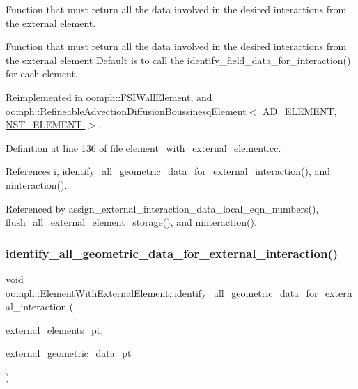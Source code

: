 Function that must return all the data involved in the desired interactions from the external element. 

Function that must return all the data involved in the desired interactions from the external element Default is to call the identify\+\_\+field\+\_\+data\+\_\+for\+\_\+interaction() for each element. 

Reimplemented in \hyperlink{classoomph_1_1FSIWallElement_a7a9552507bd4193dc3121a60453ed392}{oomph\+::\+F\+S\+I\+Wall\+Element}, and \hyperlink{classoomph_1_1RefineableAdvectionDiffusionBoussinesqElement_abb212175a68a9686ead329ba9fa330f6}{oomph\+::\+Refineable\+Advection\+Diffusion\+Boussinesq\+Element$<$ A\+D\+\_\+\+E\+L\+E\+M\+E\+N\+T, N\+S\+T\+\_\+\+E\+L\+E\+M\+E\+N\+T $>$}.



Definition at line 136 of file element\+\_\+with\+\_\+external\+\_\+element.\+cc.



References i, identify\+\_\+all\+\_\+geometric\+\_\+data\+\_\+for\+\_\+external\+\_\+interaction(), and ninteraction().



Referenced by assign\+\_\+external\+\_\+interaction\+\_\+data\+\_\+local\+\_\+eqn\+\_\+numbers(), flush\+\_\+all\+\_\+external\+\_\+element\+\_\+storage(), and ninteraction().

\mbox{\label{classoomph_1_1ElementWithExternalElement_aa6d8ce7d46edf8fc06557776663af172}} 
\subsubsection{\texorpdfstring{identify\+\_\+all\+\_\+geometric\+\_\+data\+\_\+for\+\_\+external\+\_\+interaction()}{identify\_all\_geometric\_data\_for\_external\_interaction()}}
{\footnotesize\ttfamily void oomph\+::\+Element\+With\+External\+Element\+::identify\+\_\+all\+\_\+geometric\+\_\+data\+\_\+for\+\_\+external\+\_\+interaction (\begin{DoxyParamCaption}\item[{\hyperlink{classoomph_1_1Vector}{Vector}$<$ std\+::set$<$ \hyperlink{classoomph_1_1FiniteElement}{Finite\+Element} $\ast$$>$ $>$ const \&}]{external\+\_\+elements\+\_\+pt,  }\item[{std\+::set$<$ \hyperlink{classoomph_1_1Data}{Data} $\ast$$>$ \&}]{external\+\_\+geometric\+\_\+data\+\_\+pt }\end{DoxyParamCaption})\hspace{0.3cm}{\ttfamily [virtual]}}



